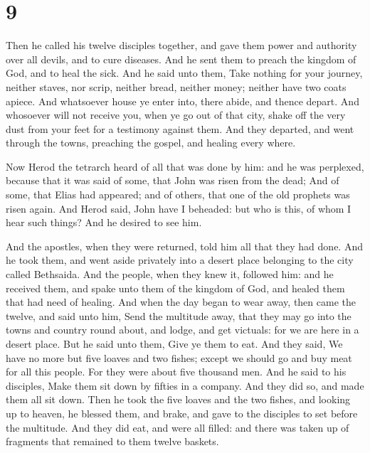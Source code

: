 \hypertarget{section-8}{%
\section{9}\label{section-8}}

 Then he called his twelve disciples together, and gave
them power and authority over all devils, and to cure diseases.
 And he sent them to preach the kingdom of God, and to
heal the sick.  And he said unto them, Take nothing for
your journey, neither staves, nor scrip, neither bread, neither money;
neither have two coats apiece.  And whatsoever house ye
enter into, there abide, and thence depart.  And whosoever
will not receive you, when ye go out of that city, shake off the very
dust from your feet for a testimony against them.  And
they departed, and went through the towns, preaching the gospel, and
healing every where.

 Now Herod the tetrarch heard of all that was done by him:
and he was perplexed, because that it was said of some, that John was
risen from the dead;  And of some, that Elias had
appeared; and of others, that one of the old prophets was risen again.
 And Herod said, John have I beheaded: but who is this, of
whom I hear such things? And he desired to see him.

 And the apostles, when they were returned, told him all
that they had done. And he took them, and went aside privately into a
desert place belonging to the city called Bethsaida.  And
the people, when they knew it, followed him: and he received them, and
spake unto them of the kingdom of God, and healed them that had need of
healing.  And when the day began to wear away, then came
the twelve, and said unto him, Send the multitude away, that they may go
into the towns and country round about, and lodge, and get victuals: for
we are here in a desert place.  But he said unto them,
Give ye them to eat. And they said, We have no more but five loaves and
two fishes; except we should go and buy meat for all this people.
 For they were about five thousand men. And he said to
his disciples, Make them sit down by fifties in a company.
 And they did so, and made them all sit down.
 Then he took the five loaves and the two fishes, and
looking up to heaven, he blessed them, and brake, and gave to the
disciples to set before the multitude.  And they did eat,
and were all filled: and there was taken up of fragments that remained
to them twelve baskets.

